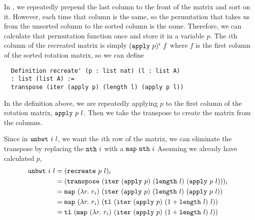 \documentclass[sigplan,10pt,anonymous,review]{thesis}
\begin{document}
In , we repeatedly prepend the last column to the front
of the matrix and sort on it. However, each time that column is the
same, so the permutation that takes us from the unsorted column to the
sorted column is the same. Therefore, we can calculate that
permutation function once and store it in a variable $p$. The $i$th
column of the recreated matrix is simply $(\texttt{\textup{apply}}~p)^i~f$ where
$f$ is the first column of the sorted rotation matrix, so we can
define
\begin{lstlisting}
  Definition recreate' (p : list nat) (l : list A)
  : list (list A) :=
  transpose (iter (apply p) (length l) (apply p l))
\end{lstlisting}
In the definition above, we are repeatedly applying $p$ to the
first column of the rotation matrix, $\texttt{\textup{apply}}~p~l$. Then we
take the transpose to create the matrix from the columns.

Since in $\texttt{\textup{unbwt}}~i~l$, we want the $i$th row of the matrix, we
can eliminate the transpose by replacing the $\texttt{\textup{nth}}~i$ with a
$\texttt{\textup{map}}~\texttt{\textup{nth}}~i$ Assuming we already have calculated $p$,
\begin{align*}
  \texttt{\textup{unbwt}}~i~l &= (\texttt{\textup{recreate}}~p~l)_i \\
  &= (\texttt{\textup{transpose}}~(\texttt{\textup{iter}}~(\texttt{\textup{apply}}~p)~(\texttt{\textup{length}}~l)~(\texttt{\textup{apply}}~p~l)))_i \\
  &= \texttt{\textup{map}}~(\lambda
  r.~r_i)~(\texttt{\textup{iter}}~(\texttt{\textup{apply}}~p)~(\texttt{\textup{length}}~l)~(\texttt{\textup{apply}}~p~l)) \\
  &= \texttt{\textup{map}}~(\lambda r.~r_i)~(\texttt{\textup{tl}}~(\texttt{\textup{iter}}~(\texttt{\textup{apply}}~p)~(1 +
  \texttt{\textup{length}}~l)~l)) \\
  &= \texttt{\textup{tl}}~(\texttt{\textup{map}}~(\lambda r.~r_i)~(\texttt{\textup{iter}}~(\texttt{\textup{apply}}~p)~(1 + \texttt{\textup{length}}~l)~l))
\end{align*}
\end{document}
